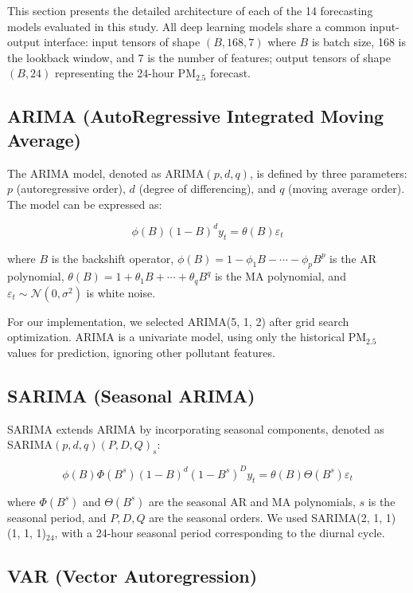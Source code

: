 This section presents the detailed architecture of each of the 14 forecasting models evaluated in this study. All deep learning models share a common input-output interface: input tensors of shape $(B, 168, 7)$ where $B$ is batch size, 168 is the lookback window, and 7 is the number of features; output tensors of shape $(B, 24)$ representing the 24-hour PM$_{2.5}$ forecast.

\subsection{ARIMA (AutoRegressive Integrated Moving Average)}

The ARIMA model, denoted as ARIMA$(p, d, q)$, is defined by three parameters: $p$ (autoregressive order), $d$ (degree of differencing), and $q$ (moving average order). The model can be expressed as:

\begin{equation}
    \phi(B)(1 - B)^d y_t = \theta(B)\varepsilon_t
\end{equation}

where $B$ is the backshift operator, $\phi(B) = 1 - \phi_1 B - \cdots - \phi_p B^p$ is the AR polynomial, $\theta(B) = 1 + \theta_1 B + \cdots + \theta_q B^q$ is the MA polynomial, and $\varepsilon_t \sim \mathcal{N}(0, \sigma^2)$ is white noise.

For our implementation, we selected ARIMA(5, 1, 2) after grid search optimization. ARIMA is a univariate model, using only the historical PM$_{2.5}$ values for prediction, ignoring other pollutant features.

\subsection{SARIMA (Seasonal ARIMA)}

SARIMA extends ARIMA by incorporating seasonal components, denoted as SARIMA$(p, d, q)(P, D, Q)_s$:

\begin{equation}
    \phi(B)\Phi(B^s)(1 - B)^d(1 - B^s)^D y_t = \theta(B)\Theta(B^s)\varepsilon_t
\end{equation}

where $\Phi(B^s)$ and $\Theta(B^s)$ are the seasonal AR and MA polynomials, $s$ is the seasonal period, and $P, D, Q$ are the seasonal orders. We used SARIMA(2, 1, 1)(1, 1, 1)$_{24}$, with a 24-hour seasonal period corresponding to the diurnal cycle.

\subsection{VAR (Vector Autoregression)}

